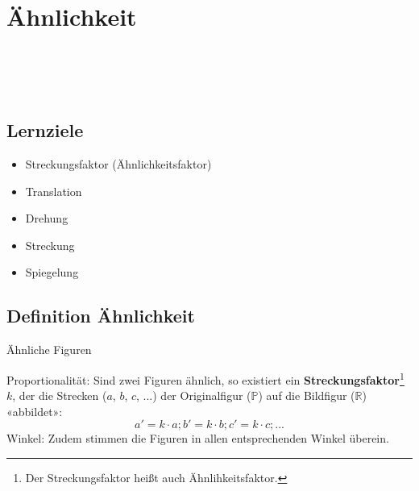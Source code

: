 
\section{Ähnlichkeit}
\\
\\
\\

\subsection*{Lernziele}

\begin{itemize}
\item Streckungsfaktor (Ähnlichkeitsfaktor)
\item Translation
\item Drehung
\item Streckung
\item Spiegelung
\end{itemize}
\newpage




\subsection{Definition Ähnlichkeit}



\begin{definition}{Ähnliche Figuren}{}
  
Proportionalität: Sind zwei Figuren ähnlich, so existiert ein
\textbf{Streckungsfaktor}\footnote{Der
  Streckungsfaktor heißt auch Ähnlihkeitsfaktor.}
$k$, der die Strecken ($a$, $b$, $c$, ...) der Originalfigur
($\mathbb{P}$) auf die Bildfigur ($\mathbb{R}$) «abbildet»:
$$a' = k\cdot{}a; b' = k\cdot{}b; c' = k\cdot{} c; ...$$
Winkel: Zudem stimmen die Figuren in allen entsprechenden Winkel überein.
\end{definition}

